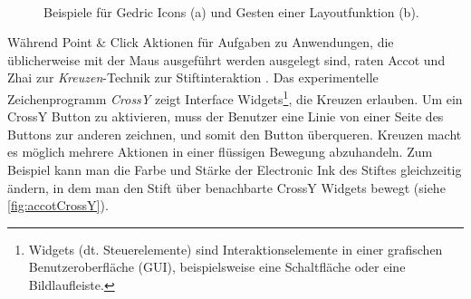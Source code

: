 \begin{figure}
        \myfloatalign
         \quad
         \\
        \caption[Gedric \newline \citep{Geissler:1995}]{Beispiele für Gedric Icons (a) und Gesten einer Layoutfunktion (b).}\label{fig:geisslerGedric}
\end{figure}

\medskip Während Point \& Click Aktionen für Aufgaben zu Anwendungen, die üblicherweise mit der Maus ausgeführt werden ausgelegt sind, raten Accot und Zhai zur \emph{Kreuzen}-Technik zur Stiftinteraktion \citep{Accot:2002}. Das experimentelle Zeichenprogramm \emph{CrossY} \citep{Apitz:2004} zeigt Interface Widgets\footnote{Widgets (dt. Steuerelemente) sind Interaktionselemente in einer grafischen Benutzeroberfläche (\ac{GUI}), beispielsweise eine Schaltfläche oder eine Bildlaufleiste.}, die Kreuzen erlauben. Um ein CrossY Button zu aktivieren, muss der Benutzer eine Linie von einer Seite des Buttons zur anderen zeichnen, und somit den Button überqueren. Kreuzen macht es möglich mehrere Aktionen in einer flüssigen Bewegung abzuhandeln. Zum Beispiel kann man die Farbe und Stärke der Electronic Ink des Stiftes gleichzeitig ändern, in dem man den Stift über benachbarte CrossY Widgets bewegt (siehe \autoref{fig:accotCrossY}).

